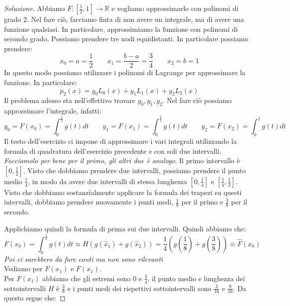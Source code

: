 \documentclass[11pt,a4paper,twoside]{article}
\theoremstyle{definition}
\newenvironment{sol}
	{\renewcommand\qedsymbol{$\blacksquare$}\begin{proof}[Soluzione]}
	{\end{proof}}
\begin{document}
\begin{sol}
	 Abbiamo $F:[\frac 12, 1] \to \mathbb R$ e vogliamo approssimarlo con polinomi di grado $2$. Nel fare ciò, facciamo finta di non avere un integrale, ma di avere una funzione qualsiasi. In particolare, approssimiamo la funzione con polinomi di secondo grado. Possiamo prendere tre nodi equidistanti. In particolare possiamo prendere:
	\[ x_0 = a = \frac 12 \qquad x_1 = \frac{b-a}2 = \frac 34 \qquad x_2 = b = 1 \]
	In questo modo possiamo utilizzare i polinomi di Lagrange per approssimare la funzione. In particolare:
	\[ p_2(x) = y_0L_0(x) + y_1L_1(x) + y_2L_2(x) \]
	Il problema adesso sta nell'effettivo trovare $y_0,y_1,y_2$. Nel fare ciò possiamo approssimare l'integrale, infatti:
	\[ y_0 = F(x_0) = \int_0^{\frac 12}g(t)dt\qquad y_1 = F(x_1) = \int_0^{\frac 34}g(t)dt\qquad y_2 = F(x_2) = \int_0^{1}g(t)dt \]
	Il testo dell'esercizio ci impone di approssimare i vari integrali utilizzando la formula di quadratura dell'esercizio precedente e con soli due intervalli.\\
	\textit{Facciamolo per bene per il primo, gli altri due è analogo}. Il primo intervallo è $[0,\frac 12]$. Visto che dobbiamo prendere due intervalli, possiamo prendere il punto medio $\frac 14$, in modo da avere due intervalli di stessa lunghezza $[0,\frac 14]$ e $[\frac 14, \frac 12]$. Visto che dobbiamo sostanzialmente applicare la formula dei trapezi su questi intervalli, dobbiamo prendere nuovamente i punti medi, $\frac 18$ per il primo e $\frac 38$ per il secondo.
	\begin{center}
	\end{center}
	Applichiamo quindi la formula di prima sui due intervalli. Quindi abbiamo che:
	\[ F(x_0) = \int_0^{\frac 12}g(t)dt \approx H(g(\hat x_1) + g(\hat x_2)) = \frac 14\left( g\left(\frac 18\right) + g\left( \frac 38 \right) \right) \equiv \hat F(x_0)\]
	\textit{Poi ci sarebbero da fare conti ma non sono rilevanti}\\
	Vediamo per $F(x_1)$ e $F(x_1)$.\\
	Per $F(x_1)$ abbiamo che gli estremi sono $0$ e $\frac 34$, il punto medio e lunghezza dei sottointervalli $H$ è $\frac 38$ e i punti medi dei rispettivi sottointervalli sono $\frac 3{16}$ e $\frac 9{16}$. Da questo segue che:

\end{sol}
\end{document}
